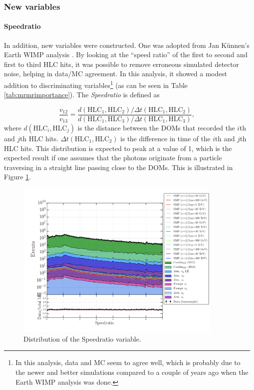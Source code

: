 \subsubsection{New variables}

\paragraph{Speedratio}
In addition, new variables were constructed. One was adopted from Jan K\"unnen's Earth WIMP analysis \cite{kunnenthesis}. By looking at the ``speed ratio'' of the first to second and first to third HLC hits, it was possible to remove erroneous simulated detector noise, helping in data/MC agreement. In this analysis, it showed a modest addition to discriminating variables\footnote{In this analysis, data and MC seem to agree well, which is probably due to the newer and better simulations compared to a couple of years ago when the Earth WIMP analysis was done.} (as can be seen in Table \ref{tab:mrmrimportance}).  The \textit{Speedratio} is defined as

\begin{equation}
\frac{v_{12}}{v_{13}} = \frac{d\left( \textrm{HLC}_1,\textrm{HLC}_2 \right)/\Delta t\left(\textrm{HLC}_1, \textrm{HLC}_2\right)}{d\left(\textrm{HLC}_1, \textrm{HLC}_3 \right)/\Delta t\left(\textrm{HLC}_1,\textrm{HLC}_3 \right)},
\end{equation}
where $d\left( \textrm{HLC}_i,\textrm{HLC}_j \right)$ is the distance between the DOMs that recorded the $i$th and $j$th HLC hits. $\Delta t\left(\textrm{HLC}_1, \textrm{HLC}_2\right)$ is the difference in time of the $i$th and $j$th HLC hits. This distribution is expected to peak at a value of 1, which is the expected result if one assumes that the photons originate from a particle traversing in a straight line passing close to the DOMs. This is illustrated in Figure \ref{fig:newvariables1}.

\begin{figure}
\centering
\includegraphics[width=0.9\textwidth]{chapter8/img/1D_stack_speedratio.png}
\caption{Distribution of the Speedratio variable.}
\label{fig:newvariables1}
\end{figure}


